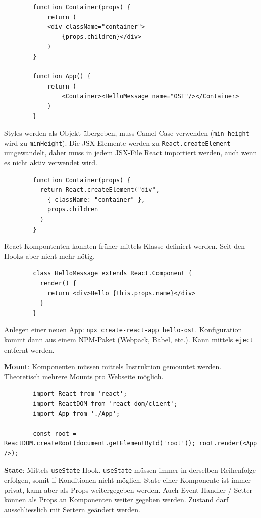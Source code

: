 \documentclass[10pt,landscape]{article}
\begin{document}
\begin{multicols}{2}
        \begin{lstlisting}
        function Container(props) {
            return (
            <div className="container">
                {props.children}</div>
            )
        }

        function App() {
            return (
                <Container><HelloMessage name="OST"/></Container>
            )
        }
        \end{lstlisting}

        Styles werden als Objekt übergeben, muss Camel Case verwenden (\lstinline{min-height} wird zu \lstinline{minHeight}).
        Die JSX-Elemente werden zu \lstinline{React.createElement} umgewandelt, daher muss in jedem JSX-File React importiert werden, auch wenn es nicht aktiv verwendet wird.

        \begin{lstlisting}
        function Container(props) {
          return React.createElement("div",
            { className: "container" },
            props.children
          )
        }
        \end{lstlisting}

        React-Kompontenten konnten früher mittels Klasse definiert werden.
        Seit den Hooks aber nicht mehr nötig.

        \begin{lstlisting}
        class HelloMessage extends React.Component {
          render() {
            return <div>Hello {this.props.name}</div>
          }
        }
        \end{lstlisting}

        Anlegen einer neuen App: \lstinline{npx create-react-app hello-ost}.
        Konfiguration kommt dann aus einem NPM-Paket (Webpack, Babel, etc.).
        Kann mittels \lstinline{eject} entfernt werden.

        \textbf{Mount}: Komponenten müssen mittels Instruktion gemountet werden.
        Theoretisch mehrere Mounts pro Webseite möglich.

        \begin{lstlisting}
        import React from 'react';
        import ReactDOM from 'react-dom/client';
        import App from './App';

        const root = ReactDOM.createRoot(document.getElementById('root')); root.render(<App />);
        \end{lstlisting}

        \textbf{State}: Mittels \lstinline{useState} Hook.
        \lstinline{useState} müssen immer in derselben Reihenfolge erfolgen, somit if-Konditionen nicht möglich.
        State einer Komponente ist immer privat, kann aber als Props weitergegeben werden.
        Auch Event-Handler / Setter können als Props an Komponenten weiter gegeben werden.
        Zustand darf ausschliesslich mit Settern geändert werden.


\end{multicols}
\end{document}
